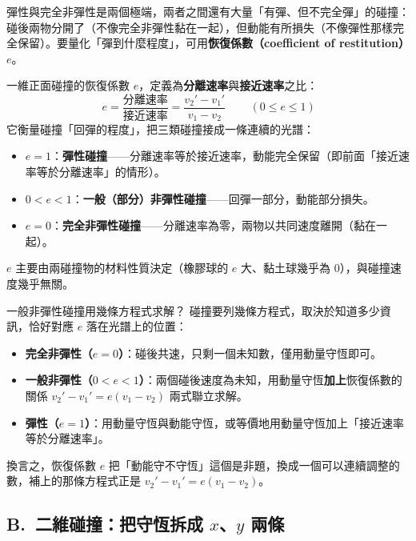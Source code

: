\documentclass[11pt]{article}
\begin{document}
彈性與完全非彈性是兩個極端，兩者之間還有大量「有彈、但不完全彈」的碰撞：碰後兩物分開了（不像完全非彈性黏在一起），但動能有所損失（不像彈性那樣完全保留）。要量化「彈到什麼程度」，可用\textbf{恢復係數（coefficient of restitution）} $e$。

一維正面碰撞的恢復係數 $e$，定義為\textbf{分離速率}與\textbf{接近速率}之比：
$$\boxed{\,e=\frac{\text{分離速率}}{\text{接近速率}}=\frac{v_2'-v_1'}{v_1-v_2}\,}\qquad(0\le e\le 1)$$
它衡量碰撞「回彈的程度」，把三類碰撞接成一條連續的光譜：
\begin{itemize}\setlength{\itemsep}{1pt}
\item $e=1$：\textbf{彈性碰撞}——分離速率等於接近速率，動能完全保留（即前面「接近速率等於分離速率」的情形）。
\item $0<e<1$：\textbf{一般（部分）非彈性碰撞}——回彈一部分，動能部分損失。
\item $e=0$：\textbf{完全非彈性碰撞}——分離速率為零，兩物以共同速度離開（黏在一起）。
\end{itemize}
$e$ 主要由兩碰撞物的材料性質決定（橡膠球的 $e$ 大、黏土球幾乎為 $0$），與碰撞速度幾乎無關。


\begin{補充框}{一般非彈性碰撞用幾條方程式求解？}
碰撞要列幾條方程式，取決於知道多少資訊，恰好對應 $e$ 落在光譜上的位置：
\begin{itemize}\setlength{\itemsep}{1pt}
\item \textbf{完全非彈性（$e=0$）}：碰後共速，只剩一個未知數，僅用動量守恆即可。
\item \textbf{一般非彈性（$0<e<1$）}：兩個碰後速度為未知，用動量守恆\textbf{加上}恢復係數的關係 $v_2'-v_1'=e(v_1-v_2)$ 兩式聯立求解。
\item \textbf{彈性（$e=1$）}：用動量守恆與動能守恆，或等價地用動量守恆加上「接近速率等於分離速率」。
\end{itemize}
換言之，恢復係數 $e$ 把「動能守不守恆」這個是非題，換成一個可以連續調整的數，補上的那條方程式正是 $v_2'-v_1'=e(v_1-v_2)$。
\end{補充框}

\subsection*{\sffamily B.\ 二維碰撞：把守恆拆成 $x$、$y$ 兩條}
\end{document}
